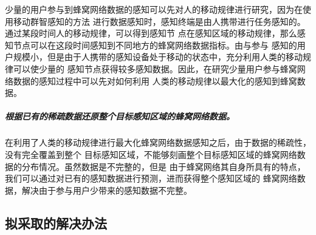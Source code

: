 \documentclass[UTF8]{ctexart}
\begin{document}
少量的用户参与到蜂窝网络数据的感知可以先对人的移动规律进行研究，因为在使用移动群智感知的方法
进行数据感知时，感知终端是由人携带进行任务感知的。通过某段时间人的移动规律，可以得到感知节
点在感知区域的移动规律，那么感知节点可以在这段时间感知到不同地方的蜂窝网络数据指标。由与参与
感知的用户规模小，但是由于人携带的感知设备处于移动的状态中，充分利用人类的移动规律可以使少量的
感知节点获得较多感知数据。因此，在研究少量用户参与蜂窝网络数据的感知过程中可以先对如何利用
人类的移动规律以最大化的感知到蜂窝数据。

\subparagraph{根据已有的稀疏数据还原整个目标感知区域的蜂窝网络数据。}

在利用了人类的移动规律进行最大化蜂窝网络数据感知之后，由于数据的稀疏性，没有完全覆盖到整个
目标感知区域，不能够刻画整个目标感知区域的蜂窝网络数据的分布情况。虽然数据是不完整的，但是
由于蜂窝网络其自身所具有的特点，我们可以通过对已有的感知数据进行预测，进而获得整个感知区域的
蜂窝网络数据，解决由于参与用户少带来的感知数据不完整。

\subsection{拟采取的解决办法}
\end{document}
